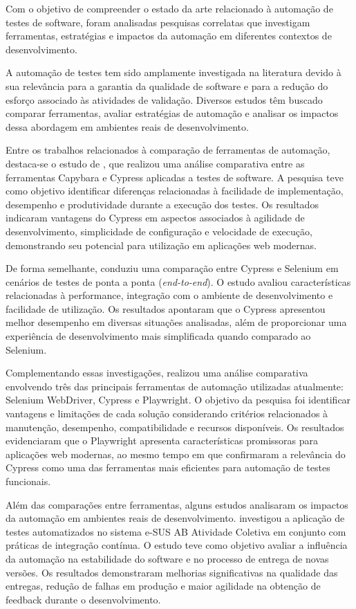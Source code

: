 \documentclass{UNESC}
\begin{document}
Com o objetivo de compreender o estado da arte relacionado à automação de testes de software, foram analisadas pesquisas correlatas que investigam ferramentas, estratégias e impactos da automação em diferentes contextos de desenvolvimento.

A automação de testes tem sido amplamente investigada na literatura devido à sua relevância para a garantia da qualidade de software e para a redução do esforço associado às atividades de validação. Diversos estudos têm buscado comparar ferramentas, avaliar estratégias de automação e analisar os impactos dessa abordagem em ambientes reais de desenvolvimento.

Entre os trabalhos relacionados à comparação de ferramentas de automação, destaca-se o estudo de , que realizou uma análise comparativa entre as ferramentas Capybara e Cypress aplicadas a testes de software. A pesquisa teve como objetivo identificar diferenças relacionadas à facilidade de implementação, desempenho e produtividade durante a execução dos testes. Os resultados indicaram vantagens do Cypress em aspectos associados à agilidade de desenvolvimento, simplicidade de configuração e velocidade de execução, demonstrando seu potencial para utilização em aplicações web modernas.

De forma semelhante,  conduziu uma comparação entre Cypress e Selenium em cenários de testes de ponta a ponta (\textit{end-to-end}). O estudo avaliou características relacionadas à performance, integração com o ambiente de desenvolvimento e facilidade de utilização. Os resultados apontaram que o Cypress apresentou melhor desempenho em diversas situações analisadas, além de proporcionar uma experiência de desenvolvimento mais simplificada quando comparado ao Selenium.

Complementando essas investigações,  realizou uma análise comparativa envolvendo três das principais ferramentas de automação utilizadas atualmente: Selenium WebDriver, Cypress e Playwright. O objetivo da pesquisa foi identificar vantagens e limitações de cada solução considerando critérios relacionados à manutenção, desempenho, compatibilidade e recursos disponíveis. Os resultados evidenciaram que o Playwright apresenta características promissoras para aplicações web modernas, ao mesmo tempo em que confirmaram a relevância do Cypress como uma das ferramentas mais eficientes para automação de testes funcionais.

Além das comparações entre ferramentas, alguns estudos analisaram os impactos da automação em ambientes reais de desenvolvimento.  investigou a aplicação de testes automatizados no sistema e-SUS AB Atividade Coletiva em conjunto com práticas de integração contínua. O estudo teve como objetivo avaliar a influência da automação na estabilidade do software e no processo de entrega de novas versões. Os resultados demonstraram melhorias significativas na qualidade das entregas, redução de falhas em produção e maior agilidade na obtenção de feedback durante o desenvolvimento.
\end{document}

